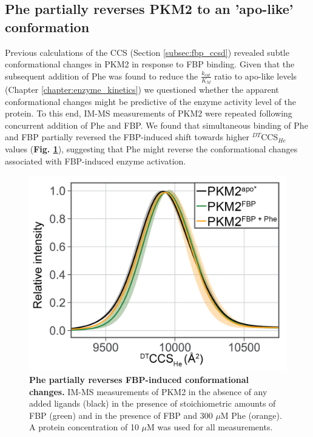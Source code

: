 \subsection{Phe partially reverses PKM2 to an 'apo-like' conformation}
\label{subsec:ccsd_phe_fbp}
Previous calculations of the CCS (Section \ref{subsec:fbp_ccsd}) revealed subtle conformational changes in PKM2 in response to FBP binding. Given that the subsequent addition of Phe was found to reduce the $\frac{k_{cat}}{K_M}$ ratio to apo-like levels (Chapter \ref{chapter:enzyme_kinetics}) we questioned whether the apparent conformational changes might be predictive of the enzyme activity level of the protein. To this end, IM-MS measurements of PKM2 were repeated following concurrent addition of Phe and FBP. We found that simultaneous binding of Phe and FBP partially reversed the FBP-induced shift towards higher $^{DT}$CCS$_{He}$ values (\textbf{Fig. \ref{fig:fbp_phe_imms}}), suggesting that Phe might reverse the conformational changes associated with FBP-induced enzyme activation.  
%
%
%
%
%
\begin{figure}[!ht]
\includegraphics[scale=0.8]{ch5_fig11_fbp_phe_imms.png}
\caption[Phe partially reverses FBP-induced conformational changes.] {\textbf{Phe partially reverses FBP-induced conformational changes.} IM-MS measurements of PKM2 in the absence of any added ligands (black) in the presence of stoichiometric amounts of FBP (green) and in the presence of FBP and 300 $\mu$M Phe (orange). A protein concentration of 10 $\mu$M was used for all measurements.}
\label{fig:fbp_phe_imms}
\end{figure}

